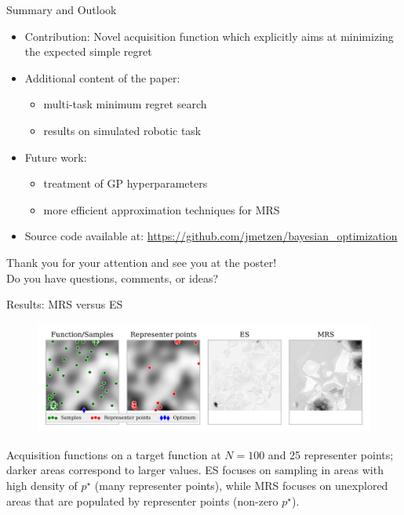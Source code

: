 \documentclass[11pt]{beamer}
\begin{document}
\begin{frame}{Summary and Outlook}
  
  \begin{itemize}
    \item Contribution: Novel acquisition function which explicitly aims at minimizing the expected simple regret
    \pause
    \item Additional content of the paper:
    \begin{itemize}
      \item multi-task minimum regret search
      \item results on simulated robotic task
    \end{itemize}
    \pause
    \item Future work:
    \begin{itemize}
      \item treatment of GP hyperparameters
      \item more efficient approximation techniques for MRS
    \end{itemize}
    \pause
    \item Source code available at: \url{https://github.com/jmetzen/bayesian_optimization}
  \end{itemize}

  \vspace*{1cm}
  \pause
  \begin{center}
   Thank you for your attention and see you at the poster! \\
   Do you have questions, comments, or ideas?
   \end{center}

\end{frame}

\appendix

\begin{frame}[noframenumbering]{Results: MRS versus ES}
\begin{figure}
\centering
\includegraphics[width=.8\textwidth]{../pics/es_analysis}
\label{fig:es_analysis}
\end{figure}

Acquisition functions on a target function at $N=100$ and 25 representer points; darker areas correspond to larger values. ES focuses on sampling in areas with high density of $p^\star$ (many representer points), while MRS focuses on unexplored areas that are populated by representer points (non-zero $p^\star$).

\end{frame}
\end{document}
